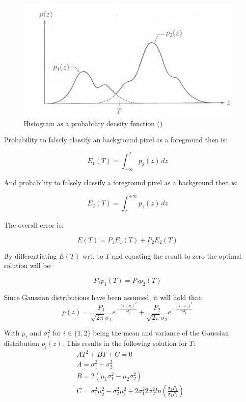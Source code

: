 \begin{figure}[htb]
	\begin{center}
		\includegraphics[width=0.8\linewidth]{bilder/Gonzalez.png}
		\caption{Histogram as a probability density function (\cite{digital_image_book})}\label{fig:gmm}
	\end{center}
\end{figure}

Probability to falsely classify an background pixel as a foreground then is:

\begin{equation}
    E_1(T) = \int_{-\infty}^T{p_2(z) \, dz}
\end{equation}

And probability to falsely classify a foreground pixel as a background then is:

\begin{equation}
    E_2(T) = \int_T^{+\infty}{p_1(z) \, dz}
\end{equation}

The overall error is:

\begin{equation}
    E(T) = P_1E_1(T) + P_2E_2(T)
\end{equation}

By differentiating $E(T)$ wrt. to $T$ and equating the result to zero the optimal solution will be:

\begin{equation}
    P_1p_1(T) = P_2p_2(T)
\end{equation}

Since Gaussian distributions have been assumed, it will hold that:
\begin{equation}
    p(z) = \frac{P_1}{\sqrt{2\pi} \sigma_1}e^{-\frac{(z-\mu_1)^2}{2\sigma_1^2}} + \frac{P_2}{\sqrt{2\pi} \sigma_2}e^{-\frac{(z-\mu_2)^2}{2\sigma_2^2}}
\end{equation}

With $\mu_i$ and $\sigma_i^2$ for $i \in \{1, 2\}$ being the mean and variance of the Gaussian distribution $p_i(z)$. This results in the following solution for $T$:
\begin{equation}
    \begin{split}
        &AT^2 + BT + C = 0 \\
        &A = \sigma_1^2 + \sigma_2^2 \\
        &B = 2(\mu_1 \sigma_1^2 - \mu_2 \sigma_2^2) \\
        &C = \sigma_1^2 \mu_2^2 - \sigma_2^2 \mu_1^2 + 2\sigma_1^2 2\sigma_2^2ln\left(\frac{\sigma_2P_1}{\sigma_1P_2}\right)
    \end{split}
\end{equation}

